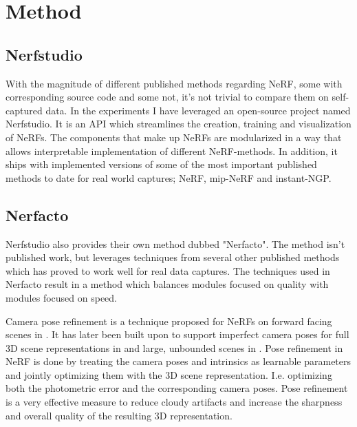 \chapter{Method}

\begin{comment}
Beskriv pipeline for å generere NeRFs

- Capture (video, image, polycam, etc.)
- Process (COLMAP, or direct extraction from e.g. Polycam)
    - Configuration of COLMAP
- Train (Different models)
    - Configuration of model
- Render (Real-time rendering vs. slow rendering)
- Evaluate (PSNR, SSIM, LPIPS)
- Export

- Pipelines created
    - Pipeline to test 
\end{comment}

\section{Nerfstudio}
With the magnitude of different published methods regarding NeRF, some with corresponding source code and some not, it's not trivial to compare them on self-captured data. In the experiments I have leveraged an open-source project named Nerfstudio. It is an API which streamlines the creation, training and visualization of NeRFs. The components that make up NeRFs are modularized in a way that allows interpretable implementation of different NeRF-methods. In addition, it ships with implemented versions of some of the most important published methods to date for real world captures; NeRF, mip-NeRF and instant-NGP.

\section{Nerfacto}
Nerfstudio also provides their own method dubbed "Nerfacto". The method isn't published work, but leverages  techniques from several other published methods which has proved to work well for real data captures. The techniques used in Nerfacto result in a method which balances modules focused on quality with modules focused on speed.


Camera pose refinement is a technique proposed for NeRFs on forward facing scenes in \cite{wang_nerf--_2022}. It has later been built upon to support imperfect camera poses for full 3D scene representations in \cite{lin_barf_2021} and large, unbounded scenes in \cite{tancik_block-nerf_2022}. Pose refinement in NeRF is done by treating the camera poses and intrinsics as learnable parameters and jointly optimizing them with the 3D scene representation. I.e. optimizing both the photometric error and the corresponding camera poses. Pose refinement is a very effective measure to reduce cloudy artifacts and increase the sharpness and overall quality of the resulting 3D representation.


